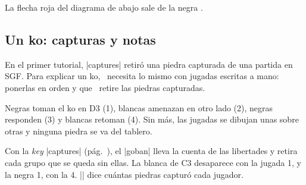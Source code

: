 \begin{goban}
\begingroup
{}

La flecha roja del diagrama de abajo sale de la negra .

\begin{goban}[partial = A1:G7, name = flechas]
\end{goban}
\endgroup

\subsection{Un ko: capturas y notas}
\label{tut:ko}

En el primer tutorial, |captures| retiró una piedra capturada de una partida en SGF. Para explicar un ko, \karu\ necesita lo mismo con jugadas escritas a mano: ponerlas en orden y que \pgfgoname\ retire las piedras capturadas.

\begin{figure}[H]
	\centering
	\begin{goban}
	\end{goban}

	\pgfgomovenotes
\end{figure}

Negras toman el ko en D3 (1), blancas amenazan en otro lado (2), negras responden (3) y blancas retoman (4). Sin más, las jugadas se dibujan unas sobre otras y ninguna piedra se va del tablero.

\begin{codeexample}[width=4.8cm]
	\begin{goban}[7]
	\end{goban}
\end{codeexample}

Con la \emph{key} |captures| (pág.~\pageref{subsec:capturas}), el |goban| lleva la cuenta de las libertades y retira cada grupo que se queda sin ellas. La blanca de C3 desaparece con la jugada 1, y la negra 1, con la 4. |\pgfgoprisoners| dice cuántas piedras capturó cada jugador.

\begin{codeexample}[width=4.8cm]
	\begin{goban}[7, captures]
	\end{goban}


\end{codeexample}
\end{goban}
